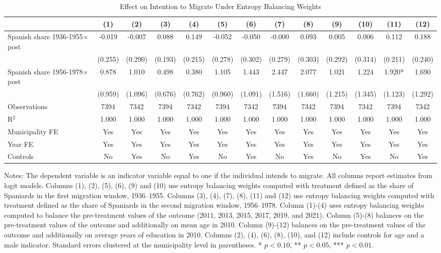 \begin{table}
\caption{Effect on Intention to Migrate Under Entropy Balancing Weights}
\renewcommand{\arraystretch}{1.25}
\centering
\begin{tabular}[t]{lcccccccccccc}
\hline
  & (1) & (2) & (3) & (4) & (5) & (6) & (7) & (8) & (9) & (10) & (11) & (12)\\
\hline
Spanish share 1936-1955$\times$post & -0.019 & -0.007 & 0.088 & 0.149 & -0.052 & -0.050 & -0.000 & 0.093 & 0.005 & 0.006 & 0.112 & 0.188\\
 & (0.255) & (0.290) & (0.193) & (0.215) & (0.278) & (0.302) & (0.279) & (0.303) & (0.292) & (0.314) & (0.211) & (0.240)\\
Spanish share 1956-1978$\times$post & 0.878 & 1.010 & 0.498 & 0.380 & 1.105 & 1.443 & 2.447 & 2.077 & 1.021 & 1.224 & 1.920* & 1.690\\
 & (0.959) & (1.096) & (0.676) & (0.762) & (0.960) & (1.091) & (1.516) & (1.660) & (1.215) & (1.345) & (1.123) & (1.292)\\

\addlinespace
Observations & 7394 & 7342 & 7394 & 7342 & 7394 & 7342 & 7394 & 7342 & 7394 & 7342 & 7394 & 7342\\
R$^2$ & 1.000 & 1.000 & 1.000 & 1.000 & 1.000 & 1.000 & 1.000 & 1.000 & 1.000 & 1.000 & 1.000 & 1.000\\
Municipality FE & Yes & Yes & Yes & Yes & Yes & Yes & Yes & Yes & Yes & Yes & Yes & Yes\\
Year FE & Yes & Yes & Yes & Yes & Yes & Yes & Yes & Yes & Yes & Yes & Yes & Yes\\
Controls & No & Yes & No & Yes & No & Yes & No & Yes & No & Yes & No & Yes\\
\hline
\end{tabular}
\vspace{0.4em}
\begin{minipage}{\textwidth}
\footnotesize Notes: The dependent variable is an indicator variable equal to one if the individual intends to migrate. All columns report estimates from logit models. Columns (1), (2), (5), (6), (9) and (10) use entropy balancing weights computed with treatment defined as the share of Spaniards in the first migration window, 1936–1955. Columns (3), (4), (7), (8), (11) and (12) use entropy balancing weights computed with treatment defined as the share of Spaniards in the second migration window, 1956–1978. Column (1)-(4) uses entropy balancing weights computed to balance the pre-treatment values of the outcome (2011, 2013, 2015, 2017, 2019, and 2021). Column (5)-(8) balances on the pre-treatment values of the outcome and additionally on mean age in 2010. Column (9)-(12) balances on the pre-treatment values of the outcome and additionally on average years of education in 2010.  Columns (2), (4), (6), (8), (10), and (12) include controls for age and a male indicator. Standard errors clustered at the municipality level in parentheses. * $p<0.10$, ** $p<0.05$, *** $p<0.01$.
\end{minipage}
\end{table}
